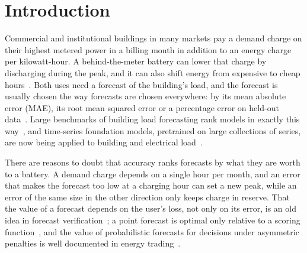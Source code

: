 \section{Introduction}\label{sec:intro}

Commercial and institutional buildings in many markets pay a demand charge on their highest metered power in a billing month in addition to an energy charge per kilowatt-hour. A behind-the-meter battery can lower that charge by discharging during the peak, and it can also shift energy from expensive to cheap hours~\cite{oudalov2007sizing,leadbetter2012battery,hanna2014dispatch,papadopoulos2020peak}. Both uses need a forecast of the building's load, and the forecast is usually chosen the way forecasts are chosen everywhere: by its mean absolute error (MAE), its root mean squared error or a percentage error on held-out data~\cite{hong2016probabilistic,wang2019smartmeter,hyndman2006another}. Large benchmarks of building load forecasting rank models in exactly this way~\cite{emami2023buildingsbench,miller2020gepiii}, and time-series foundation models, pretrained on large collections of series, are now being applied to building and electrical load~\cite{park2025tsfmbuildings,liao2025timegpt}.

There are reasons to doubt that accuracy ranks forecasts by what they are worth to a battery. A demand charge depends on a single hour per month, and an error that makes the forecast too low at a charging hour can set a new peak, while an error of the same size in the other direction only keeps charge in reserve. That the value of a forecast depends on the user's loss, not only on its error, is an old idea in forecast verification~\cite{murphy1993good}; a point forecast is optimal only relative to a scoring function~\cite{gneiting2011point,gneiting2007scoring}, and the value of probabilistic forecasts for decisions under asymmetric penalties is well documented in energy trading~\cite{pinson2007trading}.

